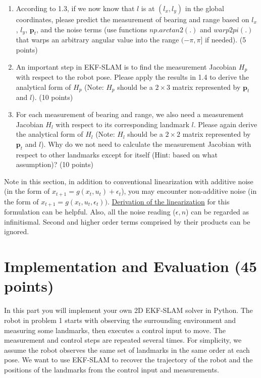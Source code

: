 \documentclass[12pt, a4paper]{article}
\begin{document}
\begin{enumerate}
	\item According to 1.3, if we now know that $l$ is at $\left(l_{x},l_{y}\right)$
	      in the global coordinates, please predict the measurement of bearing
	      and range based on $l_{x}$, $l_{y}$, $\mathbf{p}_{t}$, and the
	      noise terms (use functions $\mathit{np.arctan2}(.)$ and $\mathit{warp2pi}(.)$
	      that warps an arbitrary angular value into the range $(-\pi,\pi]$
	      if needed). (5 points)

	\item An important step in EKF-SLAM is to find the measurement Jacobian
	      $H_{p}$ with respect to the robot pose. Please apply the results
	      in 1.4 to derive the analytical form of $H_{p}$ (Note: $H_{p}$ should
	      be a $2\times3$ matrix represented by $\mathbf{p}_{t}$ and $l$).
	      (10 points)

	\item For each measurement of bearing and range, we also need a measurement
	      Jacobian $H_{l}$ with respect to its corresponding landmark $l$.
	      Please again derive the analytical form of $H_{l}$ (Note: $H_{l}$
	      should be a $2\times2$ matrix represented by $\mathbf{p}_{t}$ and
	      $l$). Why do we not need to calculate the measurement Jacobian with
	      respect to other landmarks except for itself (Hint: based on what
	      assumption)? (10 points)
\end{enumerate}

Note in this section, in addition to conventional linearization with additive noise (in the form of $x_{t+1} = g(x_t, u_t) + \epsilon_t$), you may encounter non-additive noise (in the form of $x_{t+1} = g(x_t, u_t, \epsilon_t))$. \href{https://en.wikipedia.org/wiki/Extended_Kalman_filter#Non-additive_noise_formulation_and_equations}{Derivation of the linearization} for this formulation can be helpful.
Also, all the noise reading ($\epsilon, n$) can be regarded as infinitismal. Second and higher order terms comprised by their products can be ignored.

\section{Implementation and Evaluation (45 points)}

In this part you will implement your own 2D EKF-SLAM solver in Python.
The robot in problem 1 starts with observing the surrounding environment
and measuring some landmarks, then executes a control input to move.
The measurement and control steps are repeated several times. For
simplicity, we assume the robot observes the same set of landmarks
in the same order at each pose. We want to use EKF-SLAM to recover
the trajectory of the robot and the positions of the landmarks from
the control input and measurements.
\end{document}
